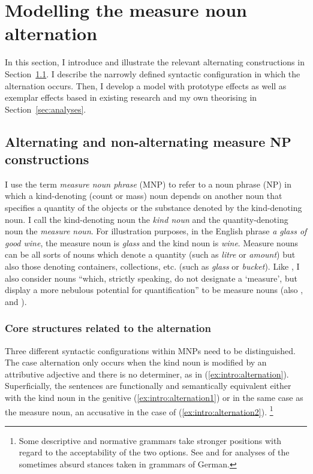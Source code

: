 \section{Modelling the measure noun alternation}
\label{sec:germanmeasurenps}

In this section, I introduce and illustrate the relevant alternating constructions in Section~\ref{sec:descriptive}.
I describe the narrowly defined syntactic configuration in which the alternation occurs.
Then, I develop a model with prototype effects as well as exemplar effects based in existing research and my own theorising in Section~\ref{sec:analyses}.

\subsection{Alternating and non-alternating measure NP constructions}
\label{sec:descriptive}

I use the term \textit{measure noun phrase} (MNP) to refer to a noun phrase (NP) in which a kind-denoting (count or mass) noun depends on another noun that specifies a quantity of the objects or the substance denoted by the kind-denoting noun.
I call the kind-denoting noun the \textit{kind noun} and the quantity-denoting noun the \textit{measure noun}.
For illustration purposes, in the English phrase \textit{a glass of good wine}, the measure noun is \textit{glass} and the kind noun is \textit{wine}.
Measure nouns can be all sorts of nouns which denote a quantity (such as \textit{litre} or \textit{amount}) but also those denoting containers, collections, etc. (such as \textit{glass} or \textit{bucket}).
Like \citet[284]{Brems2003}, I also consider nouns ``which, strictly speaking, do not designate a `measure', but display a more nebulous potential for quantification'' to be measure nouns (also \citealp[530]{Koptjevskaja2001}, and \citealp[338]{Rutkowski2007}).

\subsubsection{Core structures related to the alternation}

Three different syntactic configurations within MNPs need to be distinguished.
The case alternation only occurs when the kind noun is modified by an attributive adjective and there is no determiner, as in (\ref{ex:intro:alternation}).
Superficially, the sentences are functionally and semantically equivalent either with the kind noun in the genitive (\ref{ex:intro:alternation1}) or in the same case as the measure noun, an accusative in the case of (\ref{ex:intro:alternation2}).%
\footnote{Some descriptive and normative grammars take stronger positions with regard to the acceptability of the two options.
See \cite{Hentschel1993} and \cite{Zimmer2015} for analyses of the sometimes absurd stances taken in grammars of German.
}

